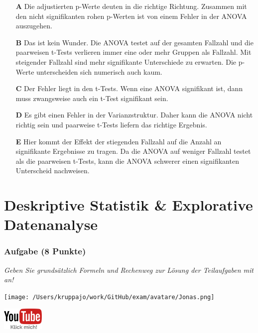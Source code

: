 \documentclass[a4paper, 9pt]{scrartcl}\usepackage[]{graphicx}\usepackage[]{xcolor}
\begin{document}
\begin{enumerate}
\item [\textbf{A} \msquare] Die adjustierten p-Werte deuten in die richtige Richtung. Zusammen mit den nicht signifikanten rohen p-Werten ist von einem Fehler in der ANOVA auszugehen.
\item [\textbf{B} \msquare] Das ist kein Wunder. Die ANOVA testet auf der gesamten Fallzahl und die paarweisen t-Tests verlieren immer eine oder mehr Gruppen als Fallzahl. Mit steigender Fallzahl sind mehr signifikante Unterschiede zu erwarten. Die p-Werte unterscheiden sich numerisch auch kaum.
\item [\textbf{C} \msquare] Der Fehler liegt in den t-Tests. Wenn eine ANOVA signifikant ist, dann muss zwangsweise auch ein t-Test signifikant sein.
\item [\textbf{D} \msquare] Es gibt einen Fehler in der Varianzstruktur. Daher kann die ANOVA nicht richtig sein und paarweise t-Tests liefern das richtige Ergebnis.
\item [\textbf{E} \msquare] Hier kommt der Effekt der stiegenden Fallzahl auf die Anzahl an signifikante Ergebnisse zu tragen. Da die ANOVA auf weniger Fallzahl testet als die paarweisen t-Tests, kann die ANOVA schwerer einen signifikanten Unterscheid nachweisen.
\end{enumerate}
    
\clearpage
\part{Deskriptive Statistik \& Explorative Datenanalyse}

\section{Aufgabe \hfill (8 Punkte)}

\textit{Geben Sie grundsätzlich Formeln und Rechenweg zur Lösung der Teilaufgaben mit an!} \\[1Ex]
 

 
\begin{minipage}[t]{0.5\textwidth}
\texttt{[image: /Users/kruppajo/work/GitHub/exam/avatare/Jonas.png]}
\end{minipage}
\begin{minipage}[t]{0.5\textwidth}
\hfill
\href{https://youtu.be/t0WYa_LVc5o}{\includegraphics[width = 2cm]{img/youtube}}
\end{minipage}
\vspace{-3ex}
\end{document}

